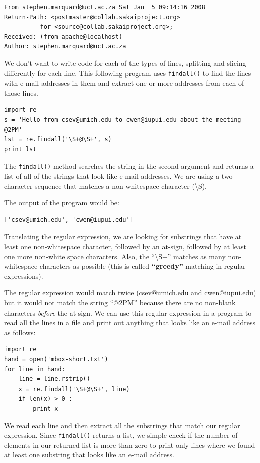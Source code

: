\documentclass[11pt]{book}
\begin{document}
\beforeverb
\begin{verbatim}
From stephen.marquard@uct.ac.za Sat Jan  5 09:14:16 2008
Return-Path: <postmaster@collab.sakaiproject.org>
          for <source@collab.sakaiproject.org>;
Received: (from apache@localhost)
Author: stephen.marquard@uct.ac.za
\end{verbatim}
\afterverb
%
We don't want to write code for each of the types of lines, splitting and slicing differently for each line.  This following program uses {\tt findall()} to find the lines with e-mail addresses in them and extract one or more addresses from each of those lines.

\beforeverb
\begin{verbatim}
import re
s = 'Hello from csev@umich.edu to cwen@iupui.edu about the meeting @2PM'
lst = re.findall('\S+@\S+', s)
print lst
\end{verbatim}
\afterverb
%
The {\tt findall()} method searches the string in the second argument and returns a list of all of the strings that look like e-mail addresses.   We are using a two-character sequence 
that matches a non-whitespace character ({\textbackslash}S). 

The output of the program would be:

\beforeverb
\begin{verbatim}
['csev@umich.edu', 'cwen@iupui.edu']
\end{verbatim}
\afterverb
%
Translating the regular expression, we are looking for substrings that have at least one non-whitespace character, followed by an at-sign, followed by at least one more non-white space characters.  Also, the ``{\textbackslash}S+'' matches as many non-whitespace characters as possible (this is called {\bf ``greedy''} matching in regular expressions).  

The regular expression would match twice (csev@umich.edu and cwen@iupui.edu) but it would not match the string ``@2PM'' because there are no non-blank characters {\em before} the at-sign.  
We can use this regular expression in a program to read all the lines in a file and print out anything that looks like an e-mail address as follows:

\beforeverb
\begin{verbatim}
import re
hand = open('mbox-short.txt')
for line in hand:
    line = line.rstrip()
    x = re.findall('\S+@\S+', line)
    if len(x) > 0 :
        print x
\end{verbatim}
\afterverb
%
We read each line and then extract all the substrings that match our regular expression.  Since {\tt findall()} returns a list, we simple check if the number of elements in our returned list is more than zero to print only lines where we found at least one substring that looks like an e-mail address.
\end{document}
